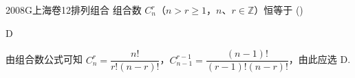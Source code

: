 
\begin{problem}{2008}{G}{上海卷}{12}{排列组合}
组合数 $ C_n^r $（$ n>r\geq 1 $，$ n $、$ r\in\mathbb{Z} $）恒等于 (\hspace{1cm})
\begin{choices}
\end{choices}
\end{problem}

\begin{answer}
D
\end{answer}

\begin{solutions}
由组合数公式可知 $ C_n^r=\dfrac{n!}{r!(n-r)!} $，$ C_{n-1}^{r-1}=\dfrac{(n-1)!}{(r-1)!(n-r)!} $，由此应选 D.
\end{solutions}